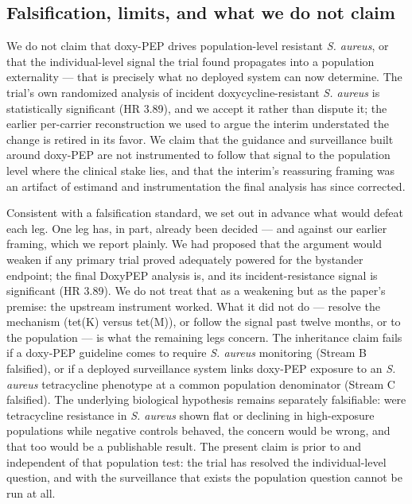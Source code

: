 \documentclass[10pt,letterpaper]{article}
\begin{document}
\subsection*{Falsification, limits, and what we do not claim}

We do not claim that doxy-PEP drives population-level resistant \emph{S.
aureus}, or that the individual-level signal the trial found propagates
into a population externality --- that is precisely what no deployed
system can now determine. The trial's own randomized analysis of
incident doxycycline-resistant \emph{S. aureus} is statistically
significant (HR 3.89), and we accept it rather than dispute it; the
earlier per-carrier reconstruction we used to argue the interim
understated the change is retired in its favor. We claim that the
guidance and surveillance built around doxy-PEP are not instrumented to
follow that signal to the population level where the clinical stake
lies, and that the interim's reassuring framing was an artifact of
estimand and instrumentation the final analysis has since corrected.

Consistent with a falsification standard, we set out in advance what
would defeat each leg. One leg has, in part, already been decided ---
and against our earlier framing, which we report plainly. We had
proposed that the argument would weaken if any primary trial proved
adequately powered for the bystander endpoint; the final DoxyPEP
analysis is, and its incident-resistance signal is significant (HR
3.89). We do not treat that as a weakening but as the paper's premise:
the upstream instrument worked. What it did not do --- resolve the
mechanism (tet(K) versus tet(M)), or follow the signal past twelve
months, or to the population --- is what the remaining legs concern. The
inheritance claim fails if a doxy-PEP guideline comes to require
\emph{S. aureus} monitoring (Stream B falsified), or if a deployed
surveillance system links doxy-PEP exposure to an \emph{S. aureus}
tetracycline phenotype at a common population denominator (Stream C
falsified). The underlying biological hypothesis remains separately
falsifiable: were tetracycline resistance in \emph{S. aureus} shown flat
or declining in high-exposure populations while negative controls
behaved, the concern would be wrong, and that too would be a publishable
result. The present claim is prior to and independent of that population
test: the trial has resolved the individual-level question, and with the
surveillance that exists the population question cannot be run at all.
\end{document}
